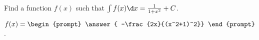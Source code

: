\documentclass{ximera}
\author{Jim Talamo}
\begin{document}
\begin{exercise}
Find a function $f(x)$ such that $\int f(x) \d x = \frac{1}{1+x^2} +C$. 

$f(x) = \begin{prompt} \answer{ -\frac{2x}{(x^2+1)^2}} \end{prompt}$.


\end{exercise}
\end{document}
